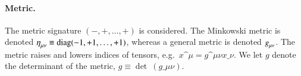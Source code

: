 \paragraph{Metric.} %
The metric signature $(-,+,\dots,+)$ is considered. %
The Minkowski metric is denoted $\eta\indices{_{\mu\nu}}\equiv\text{diag}(-1, +1,\dots,+1)$, 
whereas a general metric is denoted $g\indices{_{\mu\nu}}$. 
The metric raises and lowers indices of tensors, e.g.~$x\^\mu = g\^{\mu\nu}x\_\nu$. We let $g$ denote the determinant of the metric, $g\equiv \det~\!(g\_{\mu\nu})$.






